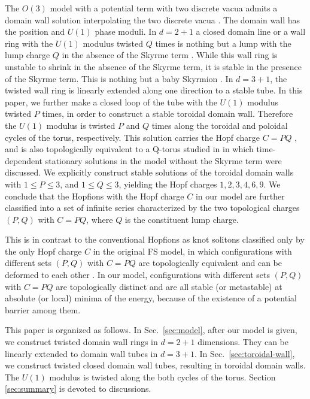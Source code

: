 \documentclass[aps,prd,preprint,
superscriptaddress]{revtex4}
\newcommand {\1}[1]{\frac{1}{#1}}
\newcommand {\2}[1]{\frac{i}{#1}}
\begin{document}
The $O(3)$ model with a potential term with two discrete vacua 
admits a domain wall solution 
interpolating the two discrete vacua  \cite{Abraham:1992vb,Arai:2002xa}.
The domain wall has the position and $U(1)$ phase moduli. 
In $d=2+1$
a closed domain line or a wall ring 
with the $U(1)$ modulus twisted $Q$ times  
is nothing but a lump 
with the lump charge $Q$ \cite{Polyakov:1975yp} 
in the absence of  the Skyrme term \cite{Nitta:2012kj,Nitta:2012kk}. 
While this wall ring is unstable to shrink 
in the absence of  the Skyrme term, 
it is stable in the presence of the Skyrme term.
This is nothing but a baby Skyrmion \cite{Piette:1994ug,Weidig:1998ii}.
In $d=3+1$, the twisted wall ring is linearly extended along one direction 
to a stable tube.  
In this paper, we further make a closed loop of the tube with 
the $U(1)$ modulus twisted $P$ times, 
in order to construct 
a stable toroidal domain wall. 
Therefore
the $U(1)$ modulus is twisted $P$ and $Q$ times 
along the toroidal and poloidal cycles of the torus, 
respectively. 
This solution carries the Hopf charge $C=PQ$ \cite{deVega:1977rk,Gladikowski:1996mb,Hietarinta:2000ci},
and is also topologically equivalent to a Q-torus studied in \cite{Bolognesi:2007zz} 
in which time-dependent stationary solutions 
in the model without the Skyrme term were discussed.
We explicitly construct stable solutions of 
the toroidal domain walls 
with $1 \leq P \leq 3$, and $1 \leq Q \leq 3$, 
yielding the Hopf charges $1,2,3,4,6,9$.
We conclude that 
the Hopfions with the Hopf charge $C$ in our model are
further classified 
into a set of infinite series characterized by 
the two topological charges $(P,Q)$ with $C=PQ$, 
where $Q$ is the constituent lump charge.

This is in contrast to the conventional Hopfions 
as knot solitons classified only by the only Hopf charge 
$C$ in the original FS model, 
in which configurations with different 
sets $(P,Q)$ with $C=PQ$ 
are topologically equivalent and can be deformed 
to each other \cite{Hietarinta:2000ci}. 
In our model, configurations with different 
sets $(P,Q)$ with $C=PQ$ 
are  topologically distinct and are all stable (or metastable)
at absolute (or local) minima of the energy, 
because of the existence of a potential barrier among them. 


This paper is organized as follows. 
 In Sec.~\ref{sec:model}, 
after our model is given, 
we construct twisted domain wall rings in $d=2+1$ dimensions. 
They can be linearly extended to domain wall tubes in $d=3+1$.
In Sec.~\ref{sec:toroidal-wall}, we construct 
twisted closed domain wall tubes, 
resulting in toroidal domain walls. 
The $U(1)$ modulus is twisted along the 
both cycles of the torus.  
Section \ref{sec:summary} is devoted to 
discussions. 
\end{document}
